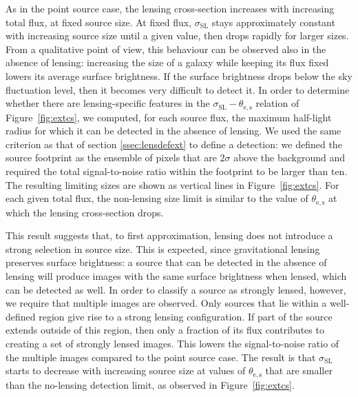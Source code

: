 \documentclass{aa}
\def\crosssect{\sigma_\mathrm{{SL}}}
\def\Fref#1{Figure~\ref{#1}\xspace}
\begin{document}

As in the point source case, the lensing cross-section increases with increasing total flux, at fixed source size.
At fixed flux, $\crosssect$ stays approximately constant with increasing source size until a given value, then drops rapidly for larger sizes.
From a qualitative point of view, this behaviour can be observed also in the absence of lensing: increasing the size of a galaxy while keeping its flux fixed lowers its average surface brightness. If the surface brightness drops below the sky fluctuation level, then it becomes very difficult to detect it.
In order to determine whether there are lensing-specific features in the $\crosssect-\theta_{\mathrm{e,s}}$ relation of \Fref{fig:extcs}, we computed, for each source flux, the maximum half-light radius for which it can be detected in the absence of lensing.
We used the same criterion as that of section \ref{ssec:lensdefext} to define a detection: we defined the source footprint as the ensemble of pixels that are $2\sigma$ above the background and required the total signal-to-noise ratio within the footprint to be larger than ten.
The resulting limiting sizes are shown as vertical lines in \Fref{fig:extcs}. For each given total flux, the non-lensing size limit is similar to the value of $\theta_{\mathrm{e,s}}$ at which the lensing cross-section drops.

This result suggests that, to first approximation, lensing does not introduce a strong selection in source size.
This is expected, since gravitational lensing preserves surface brightness: a source that can be detected in the absence of lensing will produce images with the same surface brightness when lensed, which can be detected as well.
In order to classify a source as strongly lensed, however, we require that multiple images are observed. 
Only sources that lie within a well-defined region give rise to a strong lensing configuration.
If part of the source extends outside of this region, then only a fraction of its flux contributes to creating a set of strongly lensed images.
This lowers the signal-to-noise ratio of the multiple images compared to the point source case.
The result is that $\crosssect$ starts to decrease with increasing source size at values of $\theta_{\mathrm{e,s}}$ that are smaller than the no-lensing detection limit, as observed in \Fref{fig:extcs}.
\end{document}
